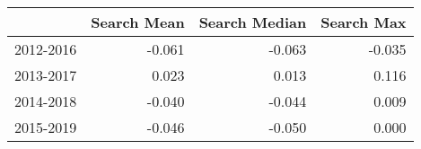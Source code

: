 \begin{table}[ht]
\centering
\begin{tabular}{rrrr}
  \hline
 & Search Mean & Search Median & Search Max \\ 
  \hline
2012-2016 & -0.061 & -0.063 & -0.035 \\ 
  2013-2017 & 0.023 & 0.013 & 0.116 \\ 
  2014-2018 & -0.040 & -0.044 & 0.009 \\ 
  2015-2019 & -0.046 & -0.050 & 0.000 \\ 
   \hline
\end{tabular}
\end{table}
